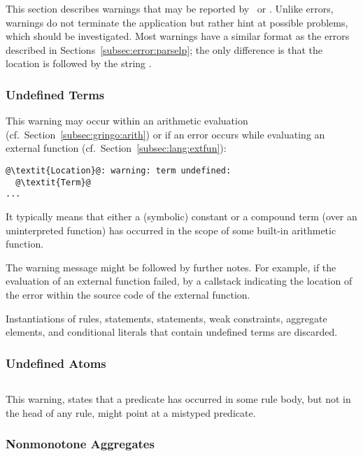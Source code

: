 This section describes warnings that may be reported by \gringo\ or \clingo.
Unlike errors, warnings do not terminate the application 
but rather hint at possible problems, which should be investigated.
Most warnings have a similar format as the errors described in Sections~\ref{subsec:error:parselp};
the only difference is that the location is followed by the string .

\subsubsection{Undefined Terms}\label{sec:warn:undefterm}
This warning may occur within an arithmetic evaluation (cf.~Section~\ref{subsec:gringo:arith})
or if an error occurs while evaluating an external function (cf.~Section~\ref{subsec:lang:extfun}):
%
\begin{lstlisting}[numbers=none,escapechar=@]
@\textit{Location}@: warning: term undefined:
  @\textit{Term}@
...
\end{lstlisting}
%
It typically means that either a (symbolic) constant or a compound term (over an uninterpreted function)
has occurred in the scope of some built-in arithmetic function.

The warning message might be followed by further notes.
For example, if the evaluation of an external function failed,
by a callstack indicating the location of the error within the source code of the external function.

Instantiations of rules,  statements,  statements, weak constraints, aggregate elements, and conditional literals
that contain undefined terms are discarded.

\subsubsection{Undefined Atoms}\label{sec:warn:undefatm}
\begin{lstlisting}[numbers=none,escapechar=@]
% warning: @\textit{p}@/@\!\textit{i}@ is never defined
\end{lstlisting}
%
This warning, states that a predicate 
has occurred in some rule body, but not in the head of any rule,
might point at a mistyped predicate.


\subsubsection{Nonmonotone Aggregates}\label{sec:warn:nonmon}

